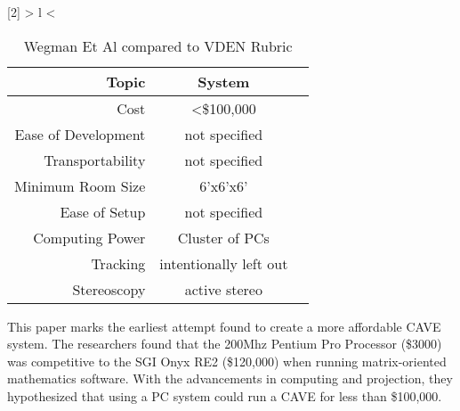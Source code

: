 \newcommand{\ns}{not specified}
\newcommand{\checkmark}{\ding{51}}
\newcommand{\cross}{\ding{55}}

\newcolumntype{R}[2]{%
	>{\bgroup}%
	l%
	<{\egroup}%
}
\newcommand*\rot{\multicolumn{1}{R{45}{1em}}}%


\label{chapter:affordableCAVEChapter}


\begin{table}[H]
	\centering
	\renewcommand\arraystretch{0.5}
	\begin{tabular}{r|c|c}
		\hline 
		Topic & System &  \\ 
		\hline 
		Cost 				& \textless \$100,000 		& \cross \\ 
		Ease of Development & \ns 						& \cross \\ 
		Transportability 	& \ns  						& \cross \\ 
		Minimum Room Size 	& 6'x6'x6' 					& \checkmark \\ 
		Ease of Setup 		& \ns 						& \cross \\ 
		Computing Power 	& Cluster of PCs 			& \cross \\ 
		Tracking 			& intentionally left out 	& \cross \\  
		Stereoscopy 		& active stereo 			& \checkmark \\ 
		\hline 
	\end{tabular} 

	\caption{Wegman Et Al compared to VDEN Rubric} \label{tab:wegmanRubric}
\end{table}

This paper marks the earliest attempt found to create a more affordable CAVE system. The researchers found that the 200Mhz Pentium Pro Processor (\$3000) was competitive to the SGI Onyx RE2 (\$120,000) when running matrix-oriented mathematics software. With the advancements in computing and projection, they hypothesized that using a PC system could run a CAVE for less than \$100,000. \cite{wegman}

\filbreak
{}

